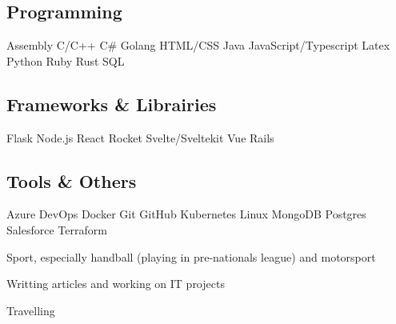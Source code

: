 \documentclass[a4paper]{MagicalCV}
\begin{document}
\begin{minipage}[t]{0.33\textwidth}

\subsection{Programming}
Assembly \textbullet{} C/C++ \textbullet{} C\# \textbullet{} Golang \textbullet{} HTML/CSS \textbullet{} Java \textbullet{} JavaScript/Typescript \textbullet{} Latex \textbullet{} Python \textbullet{} Ruby \textbullet{} Rust \textbullet{} SQL
\sectionsep

\subsection{Frameworks \& Librairies}
Flask \textbullet{} Node.js \textbullet{} React \textbullet{} Rocket \textbullet{} Svelte/Sveltekit \textbullet{} Vue \textbullet{} Rails
\sectionsep

\subsection{Tools \& Others}
Azure DevOps \textbullet{} Docker \textbullet{} Git \textbullet{}  GitHub \textbullet{} Kubernetes \textbullet{} Linux \textbullet{} MongoDB \textbullet{} Postgres \textbullet{}
Salesforce \textbullet{} Terraform
\sectionsep


\begin{tightemize}
    \item Sport, especially handball (playing in pre-nationals league) and motorsport
    \item Writting articles and working on IT projects
    \item Travelling
\end{tightemize}

\end{minipage}
\hfill
\end{document}
